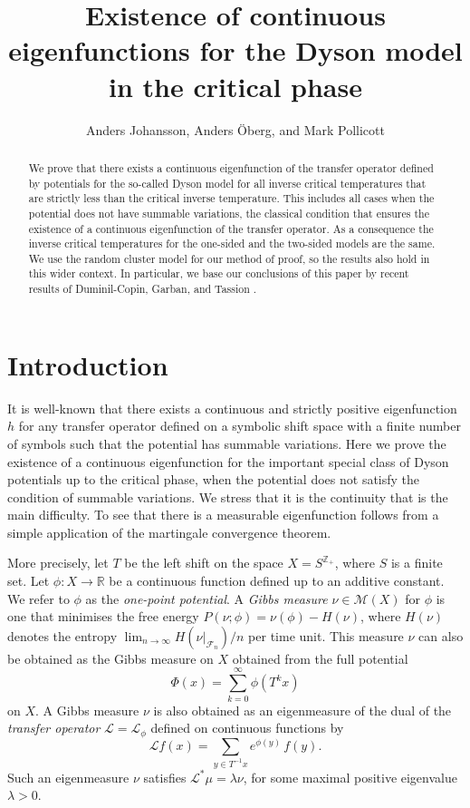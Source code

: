 \documentclass[11pt, a4paper]{amsart}
\title[Existence of continuous eigenfunction]{Existence of continuous
  eigenfunctions for the Dyson model in the critical phase}
\author{Anders Johansson, Anders \"Oberg, and Mark Pollicott}
\date{}
\theoremstyle{definition}
\theoremstyle{remark}
\providecommand{\RR}{\mathbb{R}}
\providecommand{\CF}{\mathscr{F}}
\providecommand{\CM}{\mathscr{M}}
\providecommand{\mc}{\mathcal}
\def\X{X}
\def\T{T}
\begin{document}
\maketitle
\begin{abstract}
  We prove that there exists a continuous eigenfunction of the transfer operator
  defined by potentials for the so-called Dyson model for all inverse critical
  temperatures that are strictly less than the critical inverse temperature.
  This includes all cases when the potential does not have summable variations,
  the classical condition that ensures the existence of a continuous
  eigenfunction of the transfer operator. As a consequence the inverse critical
  temperatures for the one-sided and the two-sided models are the same. We use
  the random cluster model for our method of proof, so the results also hold in
  this wider context. In particular, we base our conclusions of this paper by
  recent results of Duminil-Copin, Garban, and Tassion \cite{duminil}.
\end{abstract}
\def\h{h}


\section{Introduction}\noindent

It is well-known \cite{walters1} that there exists a continuous and strictly
positive eigenfunction $h$ for any transfer operator defined on a symbolic shift
space with a finite number of symbols such that the potential has summable
variations. Here we prove the existence of a continuous eigenfunction for the
important special class of Dyson potentials up to the critical phase, when the
potential does not satisfy the condition of summable variations. We stress that
it is the continuity that is the main difficulty. To see that there is a
measurable eigenfunction follows from a simple application of the martingale
convergence theorem.

More precisely, let $\T$ be the left shift on the space $\X=S^{{\mathbb Z}_+}$,
where $S$ is a finite set. Let $\phi:\X\to \RR$ be a continuous function defined up
to an additive constant. We refer to $\phi$ as the \emph{one-point potential}. A
\emph{Gibbs measure} $\nu\in\CM(\X)$ for $\phi$ is one that minimises the free energy
$P(\nu;\phi)=\nu(\phi)-H(\nu)$, where $H(\nu)$ denotes the entropy
$\lim_{n\to\infty} H(\nu\vert_{\CF_n})/n$ per time unit. This measure $\nu$ can also be
obtained as the Gibbs measure on $\X$ obtained from the full potential
$$ \Phi(x)=\sum_{k=0}^\infty \phi(\T^k x) $$
on $\X$. A Gibbs measure $\nu$ is also obtained as an eigenmeasure of the dual of
the \emph{transfer operator} $\mc L=\mc L_\phi$ defined on continuous functions by
\begin{equation}\label{trans}
  \mc{L} f(x)= \sum_{y\in T^{-1}x} e^{\phi(y)}\, f(y).
\end{equation}
Such an eigenmeasure $\nu$ satisfies $\mc{L}^* \mu=\lambda \nu$, for some maximal positive
eigenvalue $\lambda>0$.
\end{document}
